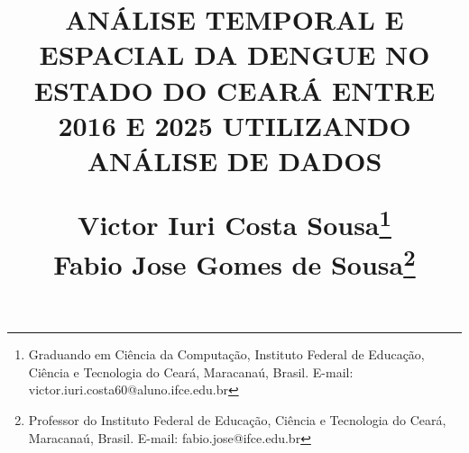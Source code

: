 \documentclass[        
    a4paper,          %
    12pt,             %
    chapter=TITLE,    %
    section=Title,    %
    subsection=Title, %
    oneside,          %
    english,          %
    spanish,          %
    brazil,           %
]{abntex2}
\date{}
\author{}
\begin{document}
\setlength{\parindent}{1.5em}



\title{
    \normalsize
    \uppercase{\textbf{Análise Temporal e Espacial da Dengue no Estado do Ceará entre 2016 e 2025 Utilizando Análise de Dados}}
    \vspace{0.5cm}
    \begin{flushright}
        Victor Iuri Costa Sousa\thanks{Graduando em Ciência da Computação, Instituto Federal de Educação, Ciência e Tecnologia do Ceará, Maracanaú, Brasil. E-mail: victor.iuri.costa60@aluno.ifce.edu.br} \\
        Fabio Jose Gomes de Sousa\thanks{Professor do Instituto Federal de Educação, Ciência e Tecnologia do Ceará, Maracanaú, Brasil. E-mail: fabio.jose@ifce.edu.br}
    \end{flushright}
}


\maketitle
\vspace{-12em}
\thispagestyle{empty}







\pagestyle{abntheadings}


\vspace{0.5cm}

\vspace{0.5cm}

\vspace{0.5cm}

\vspace{0.5cm}

\vspace{0.5cm}

\vspace{0.5cm}



\end{document}
